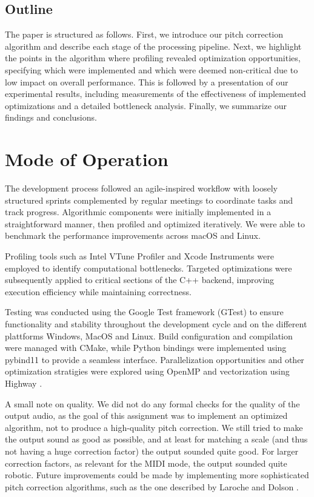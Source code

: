 \documentclass[sigconf]{acmart}
\begin{document}

    \subsection{Outline}
    The paper is structured as follows. First, we introduce our pitch correction algorithm and describe each stage of the processing pipeline. Next, we highlight the points in the algorithm where profiling revealed optimization opportunities, specifying which were implemented and which were deemed non-critical due to low impact on overall performance. This is followed by a presentation of our experimental results, including measurements of the effectiveness of implemented optimizations and a detailed bottleneck analysis. Finally, we summarize our findings and conclusions.


    \section{Mode of Operation}
    The development process followed an agile-inspired workflow with loosely structured sprints complemented by regular meetings to coordinate tasks and track progress. Algorithmic components were initially implemented in a straightforward manner, then profiled and optimized iteratively. We were able to benchmark the performance improvements across macOS and Linux.

    Profiling tools such as Intel VTune Profiler \cite{intel_vtune_profiler} and Xcode Instruments \cite{apple_xcode_instruments} were employed to identify computational bottlenecks. Targeted optimizations were subsequently applied to critical sections of the C++ backend, improving execution efficiency while maintaining correctness.

    Testing was conducted using the Google Test framework (GTest) \cite{google_googletest} to ensure functionality and stability throughout the development cycle and on the different plattforms Windows, MacOS and Linux. Build configuration and compilation were managed with CMake, while Python bindings were implemented using pybind11 \cite{pybind11} to provide a seamless interface. Parallelization opportunities and other optimization stratigies were explored using OpenMP and vectorization using Highway \cite{highway}.

    A small note on quality. We did not do any formal checks for the quality of the output audio, as the goal of this assignment was to implement an optimized algorithm, not to produce a high-quality pitch correction. We still tried to make the output sound as good as possible, and at least for matching a scale (and thus not having a huge correction factor) the output sounded quite good. For larger correction factors, as relevant for the MIDI mode, the output sounded quite robotic. Future improvements could be made by implementing more sophisticated pitch correction algorithms, such as the one described by Laroche and Dolson \cite{laroche2002time}.
\end{document}
